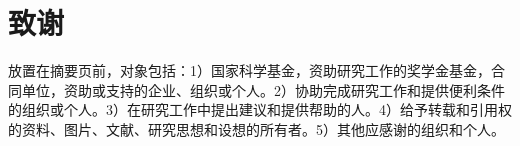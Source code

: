 \chapter*{致谢}\thispagestyle{myStyle}

放置在摘要页前，对象包括：1）国家科学基金，资助研究工作的奖学金基金，合同单位，资助或支持的企业、组织或个人。2）协助完成研究工作和提供便利条件的组织或个人。3）在研究工作中提出建议和提供帮助的人。4）给予转载和引用权的资料、图片、文献、研究思想和设想的所有者。5）其他应感谢的组织和个人。
